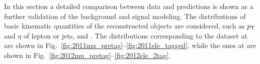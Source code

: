 In this section a detailed comparison between data and predictions is
shown as a further validation of the background and signal modeling. The
distributions of basic kinematic quantities of the reconstructed
objects are considered, such as $p_{\mathrm{T}}{}$ and $\eta$ of lepton or jets,
\met{} and \mtw{}. The distributions corresponding to the dataset at
\seventev{} are shown in
Fig.~\ref{fig:2011mu_pretag}--\ref{fig:2011ele_tagged}, while the ones
at \eighttev{} are shown in
Fig.~\ref{fig:2012mu_pretag}--\ref{fig:2012ele_2tag}. 

